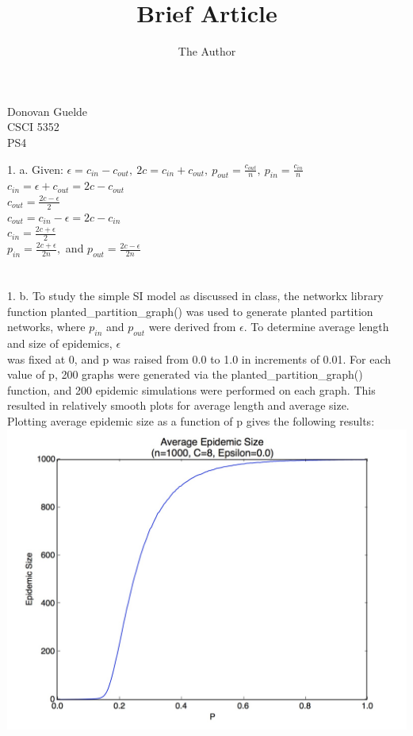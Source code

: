 \documentclass[11pt, oneside]{article}   	%
\title{Brief Article}
\author{The Author}
\begin{document}
\begin{flushright}
Donovan Guelde\\
CSCI 5352\\
PS4\\
\end{flushright}
1.  a.  Given: $\epsilon = c_{in}-c_{out},\ 2c = c_{in} + c_{out},\ p_{out}=\frac{c_{out}}{n},\ p_{in}=\frac{c_{in}}{n}$\\
\indent\indent $c_{in} = \epsilon + c_{out} = 2c-c_{out}$\\
\indent\indent $c_{out} = \frac{2c-\epsilon}{2}$\\
\indent\indent $c_{out} = c_{in}-\epsilon= 2c-c_{in}$\\
\indent\indent $c_{in} = \frac{2c+\epsilon}{2}$\\
\indent\indent $p_{in} = \frac{2c+\epsilon}{2n},$ and  $p_{out} = \frac{2c-\epsilon}{2n}$\\\\\\
1.  b.  To study the simple SI model as discussed in class, the networkx library function planted\_partition\_graph() was used to generate planted partition networks, where $p_{in}$ and $p_{out}$ were derived from $\epsilon$.  To determine average length and size of epidemics, $\epsilon$\\ was fixed at 0, and p was raised from 0.0 to 1.0 in increments of 0.01.  For each value of p, 200 graphs were generated via the planted\_partition\_graph() function, and 200 epidemic simulations were performed on each graph.  This resulted in relatively smooth plots for average length and average size.\\
\indent Plotting average epidemic size as a function of p gives the following results:\\
\includegraphics[scale=0.23]{size}\\
\end{document}
